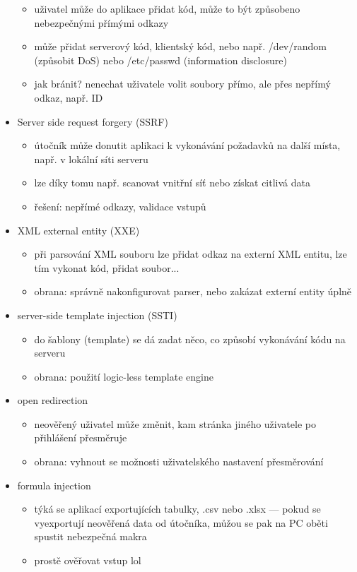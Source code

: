 \begin{itemize}
\begin{itemize}
        \item uživatel může do aplikace přidat kód, může to být způsobeno nebezpečnými přímými odkazy
        \item může přidat serverový kód, klientský kód, nebo např. /dev/random (způsobit DoS) nebo /etc/passwd (information disclosure)
        \item jak bránit? nenechat uživatele volit soubory přímo, ale přes nepřímý odkaz, např. ID
    \end{itemize}
    \item Server side request forgery (SSRF)
    \begin{itemize}
        \item útočník může donutit aplikaci k vykonávání požadavků na další místa, např. v lokální síti serveru
        \item lze díky tomu např. scanovat vnitřní síť nebo získat citlivá data
        \item řešení: nepřímé odkazy, validace vstupů
    \end{itemize}
    \item XML external entity (XXE)
    \begin{itemize}
        \item při parsování XML souboru lze přidat odkaz na externí XML entitu, lze tím vykonat kód, přidat soubor...
        \item obrana: správně nakonfigurovat parser, nebo zakázat externí entity úplně
    \end{itemize}
    \item server-side template injection (SSTI)
    \begin{itemize}
        \item do šablony (template) se dá zadat něco, co způsobí vykonávání kódu na serveru
        \item obrana: použití logic-less template engine
    \end{itemize}
    \item open redirection
    \begin{itemize}
        \item neověřený uživatel může změnit, kam stránka jiného uživatele po přihlášení přesměruje
        \item obrana: vyhnout se možnosti uživatelského nastavení přesměrování
    \end{itemize}
    \item formula injection
    \begin{itemize}
        \item týká se aplikací exportujících tabulky, .csv nebo .xlsx --- pokud se vyexportují neověřená data od útočníka, můžou se pak na PC oběti spustit nebezpečná makra
        \item prostě ověřovat vstup lol
    \end{itemize}
\end{itemize}

